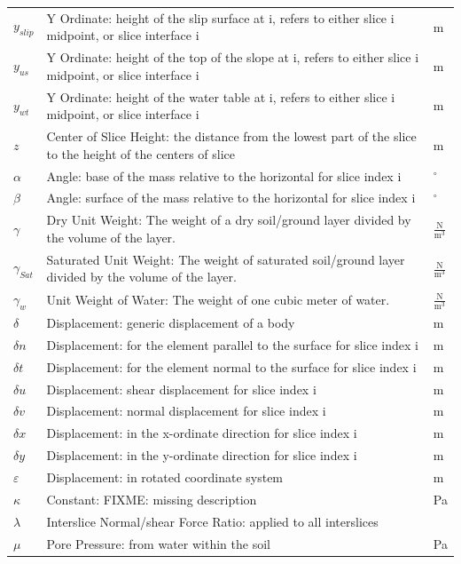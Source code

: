 \documentclass[12pt]{article}
\begin{document}
\begin{longtabu}{l X[l] l}
\\
${y_{slip}}$ & Y Ordinate: height of the slip surface at i, refers to either slice i midpoint, or slice interface i & m
\\
${y_{us}}$ & Y Ordinate: height of the top of the slope at i, refers to either slice i midpoint, or slice interface i & m
\\
${y_{wt}}$ & Y Ordinate: height of the water table at i, refers to either slice i midpoint, or slice interface i & m
\\
$z$ & Center of Slice Height: the distance from the lowest part of the slice to the height of the centers of slice & m
\\
$α$ & Angle: base of the mass relative to the horizontal for slice index i & ${}^{\circ}$
\\
$β$ & Angle: surface of the mass relative to the horizontal for slice index i & ${}^{\circ}$
\\
$γ$ & Dry Unit Weight: The weight of a dry soil/ground layer divided by the volume of the layer. & $\frac{\text{N}}{\text{m}^{3}}$
\\
${γ_{Sat}}$ & Saturated Unit Weight: The weight of saturated soil/ground layer divided by the volume of the layer. & $\frac{\text{N}}{\text{m}^{3}}$
\\
${γ_{w}}$ & Unit Weight of Water: The weight of one cubic meter of water. & $\frac{\text{N}}{\text{m}^{3}}$
\\
$δ$ & Displacement: generic displacement of a body & m
\\
$δn$ & Displacement: for the element parallel to the surface for slice index i & m
\\
$δt$ & Displacement: for the element normal to the surface for slice index i & m
\\
$δu$ & Displacement: shear displacement for slice index i & m
\\
$δv$ & Displacement: normal displacement for slice index i & m
\\
$δx$ & Displacement: in the x-ordinate direction for slice index i & m
\\
$δy$ & Displacement: in the y-ordinate direction for slice index i & m
\\
$ε$ & Displacement: in rotated coordinate system & m
\\
$κ$ & Constant: FIXME: missing description & Pa
\\
$λ$ & Interslice Normal/shear Force Ratio: applied to all interslices & 
\\
$μ$ & Pore Pressure: from water within the soil & Pa

\end{longtabu}
\end{document}
